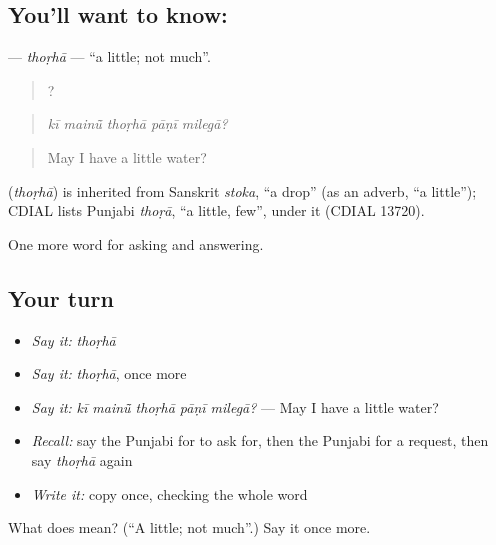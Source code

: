 \subsection*{You'll want to know: }
\textbf{} — \emph{thoṛhā} — \textquotedblleft{}a little; not much\textquotedblright{}.

\begin{quote}
    ?
\end{quote}

\begin{quote}
\emph{kī mainū̃ thoṛhā pāṇī milegā?}
\end{quote}

\begin{quote}
May I have a little water?
\end{quote}

\begin{cousinweb}
\textbf{} (\emph{thoṛhā}) is inherited from Sanskrit \emph{stoka}, \textquotedblleft{}a drop\textquotedblright{} (as an adverb, \textquotedblleft{}a little\textquotedblright{}); CDIAL lists Punjabi \emph{thoṛā}, \textquotedblleft{}a little, few\textquotedblright{}, under it (CDIAL 13720).
\end{cousinweb}

\begin{grammarlens}[title={What you've built}]
One more word for asking and answering.
\end{grammarlens}

\subsection*{Your turn}
\begin{itemize}
\raggedright
  \item \emph{Say it:} \emph{thoṛhā}
  \item \emph{Say it:} \emph{thoṛhā}, once more
  \item \emph{Say it:} \emph{kī mainū̃ thoṛhā pāṇī milegā?} — May I have a little water?
  \item \emph{Recall:} say the Punjabi for to ask for, then the Punjabi for a request, then say \emph{thoṛhā} again
  \item \emph{Write it:} copy \textbf{} once, checking the whole word
\end{itemize}

\begin{tcolorbox}[breakable,colback=teal!4,colframe=teal!35!black,title={Before you move on}]
What does  mean? (\textquotedblleft{}A little; not much\textquotedblright{}.) Say it once more.
\end{tcolorbox}
